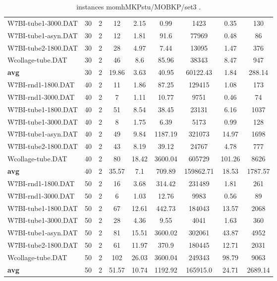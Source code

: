 \begin{table}[!ht]
{\begin{tabular}{lcccccccc}
W7BI-tube1-3000.DAT & 30 & 2 & 12 & 2.15 & 0.99 & 1423 & 0.35 & 130 \\
W7BI-tube1-asyn.DAT & 30 & 2 & 12 & 1.81 & 91.6 & 77969 & 0.48 & 86 \\
W7BI-tube2-1800.DAT & 30 & 2 & 28 & 4.97 & 7.44 & 13095 & 1.47 & 376 \\
Wcollage-tube.DAT & 30 & 2 & 46 & 8.6 & 85.96 & 38343 & 8.47 & 947 \\
\hline \textbf{avg} & 30 & 2 & 19.86 & 3.63 & 40.95 & 60122.43 & 1.84 & 288.14 \\ \hline
W7BI-rnd1-1800.DAT & 40 & 2 & 11 & 1.86 & 87.25 & 129415 & 1.08 & 173 \\
W7BI-rnd1-3000.DAT & 40 & 2 & 7 & 1.11 & 10.77 & 9751 & 0.46 & 74 \\
W7BI-tube1-1800.DAT & 40 & 2 & 51 & 8.54 & 38.45 & 23131 & 6.16 & 1037 \\
W7BI-tube1-3000.DAT & 40 & 2 & 8 & 1.75 & 6.39 & 5173 & 0.99 & 128 \\
W7BI-tube1-asyn.DAT & 40 & 2 & 49 & 9.84 & 1187.19 & 321073 & 14.97 & 1698 \\
W7BI-tube2-1800.DAT & 40 & 2 & 43 & 8.19 & 39.12 & 24767 & 4.78 & 777 \\
Wcollage-tube.DAT & 40 & 2 & 80 & 18.42 & 3600.04 & 605729 & 101.26 & 8626 \\
\hline \textbf{avg} & 40 & 2 & 35.57 & 7.1 & 709.89 & 159862.71 & 18.53 & 1787.57 \\ \hline
W7BI-rnd1-1800.DAT & 50 & 2 & 16 & 3.68 & 314.42 & 231489 & 1.81 & 261 \\
W7BI-rnd1-3000.DAT & 50 & 2 & 6 & 1.03 & 12.76 & 9983 & 0.56 & 89 \\
W7BI-tube1-1800.DAT & 50 & 2 & 67 & 12.61 & 442.73 & 184043 & 13.57 & 2068 \\
W7BI-tube1-3000.DAT & 50 & 2 & 28 & 4.36 & 9.55 & 4041 & 1.63 & 360 \\
W7BI-tube1-asyn.DAT & 50 & 2 & 81 & 15.51 & 3600.02 & 302061 & 43.87 & 4952 \\
W7BI-tube2-1800.DAT & 50 & 2 & 61 & 11.97 & 370.9 & 180445 & 12.71 & 2031 \\
Wcollage-tube.DAT & 50 & 2 & 102 & 26.03 & 3600.04 & 249343 & 98.79 & 9063 \\
\hline \textbf{avg} & 50 & 2 & 51.57 & 10.74 & 1192.92 & 165915.0 & 24.71 & 2689.14 \\ \hline
\bottomrule
\end{tabular}
}%
\caption{ instances momhMKPstu/MOBKP/set3 .}
\label{tab:table_compareBB_momhMKPstu/MOBKP/set3 }
\end{table}
